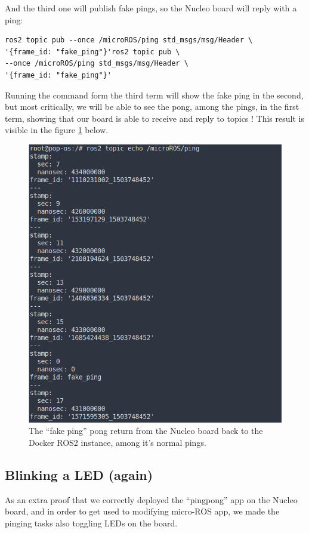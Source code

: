 \documentclass[10pt]{article}
\begin{document}
And the third one will publish fake pings, so the Nucleo board will reply with a ping:
\begin{tcolorbox}
\begin{verbatim}
ros2 topic pub --once /microROS/ping std_msgs/msg/Header \
'{frame_id: "fake_ping"}'ros2 topic pub \
--once /microROS/ping std_msgs/msg/Header \
'{frame_id: "fake_ping"}'
\end{verbatim}
\end{tcolorbox}

Running the command form the third term will show the fake ping in the second, but most critically, we will be able to see the pong, among the pings, in the first term, showing that our board is able to receive and reply to topics ! This result is visible in the figure \ref{fig:pingpong} below.


\begin{figure}[!h]
  \centering
  \includegraphics[width=.9\textwidth]{./img/pingpong.png}
  \caption{The ``fake ping'' pong return from the Nucleo board back to the Docker ROS2 instance, among it's normal pings.}
  \label{fig:pingpong}
\end{figure}


\subsection{Blinking a LED (again)}
\label{sec:blinking-led-again}
As an extra proof that we correctly deployed the ``pingpong'' app on the Nucleo board, and in order to get used to modifying micro-ROS app, we made the pinging tasks also toggling LEDs on the board.\\
\end{document}
